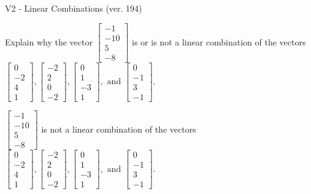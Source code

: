 \begin{exercise}
  \begin{exerciseTitle}V2 - Linear Combinations (ver. 194)\end{exerciseTitle}
  \begin{exerciseStatement}
    Explain why the vector \(\left[\begin{array}{c}
-1 \\
-10 \\
5 \\
-8
\end{array}\right]\)  is or is not a linear 
	combination of the vectors \(\left[\begin{array}{c}
0 \\
-2 \\
4 \\
1
\end{array}\right] , \left[\begin{array}{c}
-2 \\
2 \\
0 \\
-2
\end{array}\right] , \left[\begin{array}{c}
0 \\
1 \\
-3 \\
1
\end{array}\right] , \text{ and } \left[\begin{array}{c}
0 \\
-1 \\
3 \\
-1
\end{array}\right]\).
	


  \end{exerciseStatement}
  \begin{exerciseAnswer}
   \(\left[\begin{array}{c}
-1 \\
-10 \\
5 \\
-8
\end{array}\right]\) 
  	 is not  
	a linear combination of the vectors \(\left[\begin{array}{c}
0 \\
-2 \\
4 \\
1
\end{array}\right] , \left[\begin{array}{c}
-2 \\
2 \\
0 \\
-2
\end{array}\right] , \left[\begin{array}{c}
0 \\
1 \\
-3 \\
1
\end{array}\right] , \text{ and } \left[\begin{array}{c}
0 \\
-1 \\
3 \\
-1
\end{array}\right]\).


\end{exerciseAnswer}
\end{exercise}
